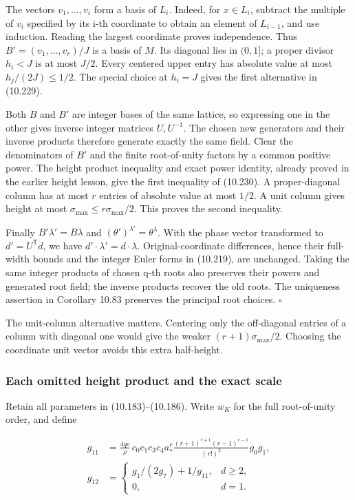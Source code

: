 \documentclass[
  11pt,
  a4paper,
]{article}
\begin{document}
The vectors \(v_1,\ldots,v_i\) form a basis of \(L_i\). Indeed, for
\(x\in L_i\), subtract the multiple of \(v_i\) specified by its i-th
coordinate to obtain an element of \(L_{i-1}\), and use induction.
Reading the largest coordinate proves independence. Thus
\(B'=(v_1,\ldots,v_r)/J\) is a basis of \(M\). Its diagonal lies in
\((0,1]\); a proper divisor \(h_i<J\) is at most \(J/2\). Every centered
upper entry has absolute value at most \(h_j/(2J)\le1/2\). The special
choice at \(h_i=J\) gives the first alternative in (10.229).

Both \(B\) and \(B'\) are integer bases of the same lattice, so
expressing one in the other gives inverse integer matrices \(U,U^{-1}\).
The chosen new generators and their inverse products therefore generate
exactly the same field. Clear the denominators of \(B'\) and the finite
root-of-unity factors by a common positive power. The height product
inequality and exact power identity, already proved in the earlier
height lesson, give the first inequality of (10.230). A proper-diagonal
column has at most \(r\) entries of absolute value at most \(1/2\). A
unit column gives height at most \(\sigma_{\max}\le r\sigma_{\max}/2\).
This proves the second inequality.

Finally \(B'\lambda'=B\lambda\) and
\((\theta')^{\lambda'}=\theta^\lambda\). With the phase vector
transformed to \(d'=U^{\mathsf T}d\), we have
\(d'\cdot\lambda'=d\cdot\lambda\). Original-coordinate differences,
hence their full-width bounds and the integer Euler forms in (10.219),
are unchanged. Taking the same integer products of chosen q-th roots
also preserves their powers and generated root field; the inverse
products recover the old roots. The uniqueness assertion in Corollary
10.83 preserves the principal root choices. \(\square\)

The unit-column alternative matters. Centering only the off-diagonal
entries of a column with diagonal one would give the weaker
\((r+1)\sigma_{\max}/2\). Choosing the coordinate unit vector avoids
this extra half-height.

\subsubsection{Each omitted height product and the exact
scale}\label{each-omitted-height-product-and-the-exact-scale}

Retain all parameters in (10.183)--(10.186). Write \(w_K\) for the full
root-of-unity order, and define

\[
\begin{aligned}
g_{11}&=\frac{4q\mathrm e}{\rho}\,
c_0c_1c_3c_4a_*^r
\frac{(r+1)^{r+1}(r-1)^{r-1}}{(r!)^2}g_0g_1,\\
g_{12}&=\begin{cases}
g_1/(2g_7)+1/g_{11},&d\ge2,\\
0,&d=1.
\end{cases}
\end{aligned}
\tag{10.231}
\]
\end{document}
